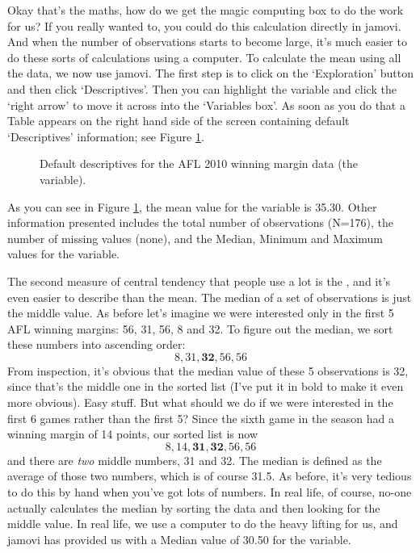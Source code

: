 
Okay that's the maths, how do we get the magic computing box to do the work for us? If you really wanted to, you could do this calculation directly in jamovi. And when the number of observations starts to become large, it's much easier to do these sorts of calculations using a computer. To calculate the mean using all the data, we now use jamovi. The first step is to click on the `Exploration' button and then click `Descriptives'. Then you can highlight the  variable and click the `right arrow' to move it across into the `Variables box'. As soon as you do that a Table appears on the right hand side of the screen containing default `Descriptives' information; see Figure \ref{fig:descriptives_default}. 

\vspace*{1cm}
\begin{figure}[h]
\begin{center}
\caption{Default descriptives for the AFL 2010 winning margin data (the  variable). }
\label{fig:descriptives_default}
\HR
\end{center}
\end{figure}

As you can see in Figure \ref{fig:descriptives_default}, the mean value for the  variable is 35.30. Other information presented includes the total number of observations (N=176), the number of missing values (none), and the Median, Minimum and Maximum values for the variable. 


The second measure of central tendency that people use a lot is the , and it's even easier to describe than the mean. The median of a set of observations is just the middle value. As before let's imagine we were interested only in the first 5 AFL winning margins: 56, 31, 56, 8 and 32. To figure out the median, we sort these numbers into ascending order:
$$
8, 31, \mathbf{32}, 56, 56
$$
From inspection, it's obvious that the median value of these 5 observations is 32, since that's the middle one in the sorted list (I've put it in bold to make it even more obvious). Easy stuff. But what should we do if we were interested in the first 6 games rather than the first 5? Since the sixth game in the season had a winning margin of 14 points, our sorted list is now 
$$
8, 14, \mathbf{31}, \mathbf{32}, 56, 56
$$
and there are {\it two} middle numbers, 31 and 32. The median is defined as the average of those two numbers, which is of course 31.5. As before, it's very tedious to do this by hand when you've got lots of numbers. In real life, of course, no-one actually calculates the median by sorting the data and then looking for the middle value. In real life, we use a computer to do the heavy lifting for us, and jamovi has provided us with a Median value of 30.50 for the  variable. 


